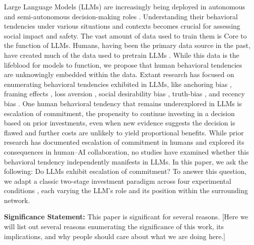 \documentclass[letterpaper]{article} %
\begin{document}
Large Language Models (LLMs) are increasingly being deployed in autonomous and semi-autonomous decision-making roles \cite{Cui-2024, Liu-2025, Rajani-2025, Lin-2025, Nie-2025, Ren-2025, Raza-2025, Sha-2023}. Understanding their behavioral tendencies under various situations and contexts becomes crucial for assessing social impact and safety. The vast amount of data used to train them is Core to the function of LLMs. Humans, having been the primary data source in the past, have created much of the data used to pretrain LLMs \cite{brown-2020, grattafiori-2024}. While this data is the lifeblood for models to function, we propose that human behavioral tendencies are unknowingly embedded within the data. Extant research has focused on enumerating behavioral tendencies exhibited in LLMs, like anchoring bias \cite{Lou-2024}, framing effects \cite{Lior-2025}, loss aversion \cite{Jia-2024}, social desirability bias \cite{Salecha-2024}, truth-bias \cite{Barkett-2025, Markowitz-2023}, and recency bias \cite{Li-2024}. One human behavioral tendency that remains underexplored in LLMs is escalation of commitment, the propensity to continue investing in a decision based on prior investments, even when new evidence suggests the decision is flawed and further costs are unlikely to yield proportional benefits. While prior research has documented escalation of commitment in humans and explored its consequences in human–AI collaboration, no studies have examined whether this behavioral tendency independently manifests in LLMs. In this paper, we ask the following: Do LLMs exhibit escalation of commitment? To answer this question, we adapt a classic two-stage investment paradigm across four experimental conditions \cite{Staw-1976}, each varying the LLM's role and its position within the surrounding network.

\textbf{Significance Statement:} This paper is significant for several reasons. [Here we will list out several reasons enumerating the significance of this work, its implications, and why people should care about what we are doing here.]

\end{document}
